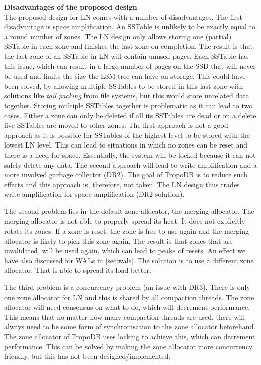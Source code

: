 \textbf{Disadvantages of the proposed design}\\
The proposed design for LN comes with a number of disadvantages. The first disadvantage is space amplification. An SSTable is unlikely to be exactly equal to a round number of zones. The LN design only allows storing one (partial) SSTable in each zone and finishes the last zone on completion. The result is that the last zone of an SSTable in LN will contain unused pages. Each SSTable has this issue, which can result in a large number of pages on the SSD that will never be used and limits the size the LSM-tree can have on storage. This could have been solved, by allowing multiple SSTables to be stored in this last zone with solutions like \textit{tail packing} from file systems, but this would store unrelated data together. Storing multiple SSTables together is problematic as it can lead to two cases. Either a zone can only be deleted if all its SSTables are dead or on a delete live SSTables are moved to other zones. The first approach is not a good approach as it is possible for SSTables of the highest level to be stored with the lowest LN level. This can lead to situations in which no zones can be reset and there is a need for space. Essentially, the system will be locked because it can not safely delete any data. The second approach will lead to write amplification and a more involved garbage collector (DR2). The goal of TropoDB is to reduce such effects and this approach is, therefore, not taken. The LN design thus trades write amplification for space amplification (DR2 solution).

The second problem lies in the default zone allocator, the merging allocator. The merging allocator is not able to properly spread its heat. It does not explicitly rotate its zones. If a zone is reset, the zone is free to use again and the merging allocator is likely to pick this zone again. The result is that zones that are invalidated, will be used again, which can lead to peaks of resets. An effect we have also discussed for WALs in \autoref{sec:wals}. The solution is to use a different zone allocator. That is able to spread its load better.

The third problem is a concurrency problem (an issue with DR3). There is only one zone allocator for LN and this is shared by all compaction threads. The zone allocator will need consensus on what to do, which will decrement performance. This means that no matter how many compaction threads are used, there will always need to be some form of synchronisation to the zone allocator beforehand. The zone allocator of TropoDB uses locking to achieve this, which can decrement performance. This can be solved by making the zone allocator more concurrency friendly, but this has not been designed/implemented.

